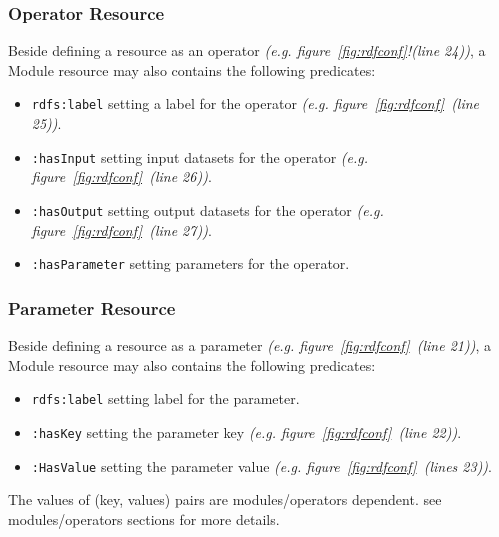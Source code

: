 \documentclass[a4paper,twoside,bibtotoc,abstracton,12pt,BCOR=15mm]{article}
\begin{document}
\subsubsection{Operator Resource}
    Beside defining a resource as an operator \emph{(e.g. figure~\ref{fig:rdfconf}!(line 24))},
    a Module resource may also contains the following predicates:
    \begin{itemize}
	\item \texttt{rdfs:label} setting a label for the operator \emph{(e.g. figure~\ref{fig:rdfconf}~(line 25))}.
	\item \texttt{:hasInput} setting input datasets for the operator \emph{(e.g. figure~\ref{fig:rdfconf}~(line 26))}.
	\item \texttt{:hasOutput} setting output datasets for the operator \emph{(e.g. figure~\ref{fig:rdfconf}~(line 27))}.
	\item \texttt{:hasParameter} setting parameters for the operator.
    \end{itemize}

\subsubsection{Parameter Resource}
    Beside defining a resource as a parameter \emph{(e.g. figure~\ref{fig:rdfconf}~(line 21))},
    a Module resource may also contains the following predicates:
    \begin{itemize}
	\item \texttt{rdfs:label} setting label for the parameter.
	\item \texttt{:hasKey} setting the parameter key \emph{(e.g. figure~\ref{fig:rdfconf}~(line 22))}.
	\item \texttt{:HasValue} setting the parameter value \emph{(e.g. figure~\ref{fig:rdfconf}~(lines 23))}.
    \end{itemize}
    The values of (key, values) pairs are modules/operators dependent.
    see	modules/operators sections for more details.
\end{document}
